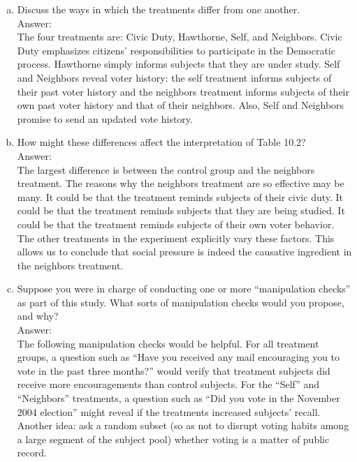 \documentclass[11pt,notitlepage]{article}\usepackage[]{graphicx}\usepackage[]{color}
\begin{document}
\begin{enumerate}[a)]
\item Discuss the ways in which the treatments differ from one another. \\
Answer:\\
The four treatments are: Civic Duty, Hawthorne, Self, and Neighbors.  Civic Duty emphasizes citizens' responsibilities to participate in the Democratic process. Hawthorne simply informs subjects that they are under study.  Self and Neighbors reveal voter history: the self treatment informs subjects of their past voter history and the neighbors treatment informs subjects of their own past voter history and that of their neighbors. Also, Self and Neighbors promise to send an updated vote history.

\item How might these differences affect the interpretation of Table 10.2?\\
Answer:\\
The largest difference is between the control group and the neighbors treatment. The reasons why the neighbors treatment are so effective may be many. It could be that the treatment reminds subjects of their civic duty.  It could be that the treatment reminds subjects that they are being studied.  It could be that the treatment reminds subjects of their own voter behavior. The other treatments in the experiment explicitly vary these factors. This allows us to conclude that social pressure is indeed the causative ingredient in the neighbors treatment.

\item Suppose you were in charge of conducting one or more ``manipulation checks'' as part of this study. What sorts of manipulation checks would you propose, and why?\\
Answer:\\
The following manipulation checks would be helpful. For all treatment groups, a question such as ``Have you received any mail encouraging you to vote in the past three months?'' would verify that treatment subjects did receive more encouragements than control subjects. For the ``Self'' and ``Neighbors'' treatments, a question such as ``Did you vote in the November 2004 election'' might reveal if the treatments increased subjects' recall.  Another idea: ask a random subset (so as not to disrupt voting habits among a large segment of the subject pool) whether voting is a matter of public record.
\end{enumerate}
\end{document}
